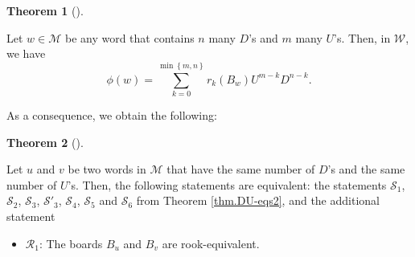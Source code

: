 \documentclass[numbers=enddot,12pt,final,onecolumn,notitlepage]{scrartcl}%
\theoremstyle{definition}
\newtheorem{theo}{Theorem}[section]
\newenvironment{theorem}[1][]
{\begin{theo}[#1]\begin{leftbar}}
{\end{leftbar}\end{theo}}
\newcommand{\W}{\mathcal{W}}
\newcommand{\M}{\mathcal{M}}
\begin{document}
\begin{theorem}
\label{thm.navon}
Let $w\in\M$ be any word that contains $n$ many
$D$'s and $m$ many $U$'s. Then, in $\W$, we have
\[
\phi\left(  w\right)
= \sum_{k=0}^{\min\left\{  m,n\right\}  }r_{k}\left(
B_{w}\right)  U^{m-k}D^{n-k}.
\]

\end{theorem}

As a consequence, we obtain the following:

\begin{theorem}
\label{thm.DU-eqs3}
Let $u$ and $v$ be two words in $\M$ that have the
same number of $D$'s and the same number of $U$'s. Then, the following
statements are equivalent:
the statements $\mathcal{S}_{1}$, $\mathcal{S}_{2}$, $\mathcal{S}_{3}$, $\mathcal{S}'_3$, $\mathcal{S}_{4}$, $\mathcal{S}_{5}$ and $\mathcal{S}_6$ from Theorem \ref{thm.DU-eqs2},
and the additional statement

\begin{itemize}
\item $\mathcal{R}_1$: The boards $B_{u}$ and $B_{v}$ are rook-equivalent.
\end{itemize}
\end{theorem}
\end{document}
